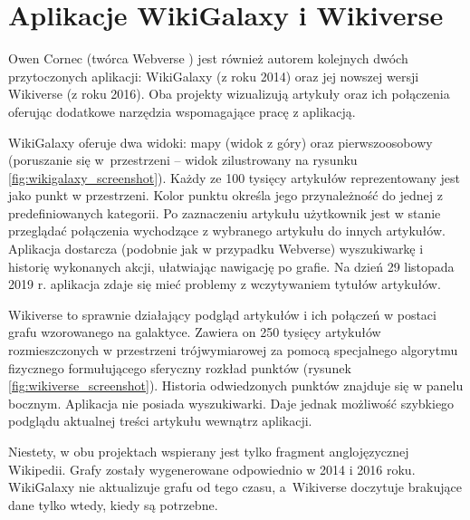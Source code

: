 \section{Aplikacje WikiGalaxy i Wikiverse}

Owen Cornec (twórca Webverse \cite{Webverse}) jest również autorem kolejnych dwóch przytoczonych aplikacji: WikiGalaxy \cite{WikiGalaxy} (z roku 2014) oraz jej nowszej wersji Wikiverse\cite{Wikiverse} (z roku 2016). Oba projekty wizualizują artykuły oraz ich połączenia oferując dodatkowe narzędzia wspomagające pracę z aplikacją.

WikiGalaxy oferuje dwa widoki: mapy (widok z góry) oraz pierwszoosobowy (poruszanie się w~przestrzeni – widok zilustrowany na rysunku \ref{fig:wikigalaxy_screenshot}). Każdy ze 100 tysięcy artykułów reprezentowany jest jako punkt w przestrzeni. Kolor punktu określa jego przynależność do jednej z predefiniowanych kategorii. Po zaznaczeniu artykułu użytkownik jest w stanie przeglądać połączenia wychodzące z wybranego artykułu do innych artykułów. Aplikacja dostarcza (podobnie jak w przypadku Webverse) wyszukiwarkę i historię wykonanych akcji, ułatwiając nawigację po grafie. Na dzień 29 listopada 2019 r. aplikacja zdaje się mieć problemy z wczytywaniem tytułów artykułów.


Wikiverse to sprawnie działający podgląd artykułów i ich połączeń w postaci grafu wzorowanego na galaktyce. Zawiera on 250 tysięcy artykułów rozmieszczonych w przestrzeni trójwymiarowej za pomocą specjalnego algorytmu fizycznego formułującego sferyczny rozkład punktów (rysunek \ref{fig:wikiverse_screenshot}). Historia odwiedzonych punktów znajduje się w panelu bocznym. Aplikacja nie posiada wyszukiwarki. Daje jednak możliwość szybkiego podglądu aktualnej treści artykułu wewnątrz aplikacji.

Niestety, w obu projektach wspierany jest tylko fragment anglojęzycznej Wikipedii. Grafy zostały wygenerowane odpowiednio w 2014 i 2016 roku. WikiGalaxy nie aktualizuje grafu od tego czasu, a~Wikiverse doczytuje brakujące dane tylko wtedy, kiedy są potrzebne.

